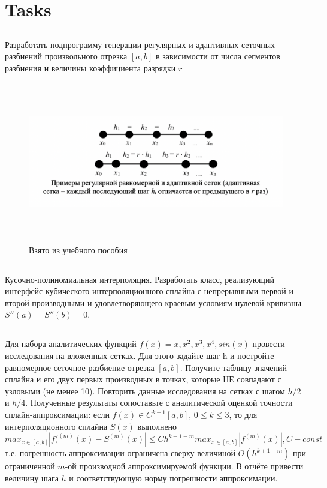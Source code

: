\section{Tasks}


\subsection{}
Разработать подпрограмму генерации регулярных и адаптивных сеточных разбиений произвольного отрезка \([a, b]\) в зависимости от числа сегментов разбиения и величины коэффициента разрядки \(r\)
\begin{figure}
	\includegraphics[width=\linewidth, height=7cm]{images/imaget1.png}
	\caption{Взято из учебного пособия}
\end{figure}

\subsection{}
Кусочно-полиномиальная интерполяция. Разработать класс, реализующий интерфейс кубического интерполяционного сплайна с непрерывными первой и второй производными и удовлетворяющего краевым условиям нулевой кривизны \(S'' (a) = S'' (b) = 0\).

\subsection{}
Для набора аналитических функций \(f(x) = x, x^2, x^3, x^4, sin(x)\) провести исследования на вложенных сетках. Для этого задайте шаг h и постройте равномерное сеточное разбиение отрезка \([a, b]\). Получите таблицу значений сплайна и его двух первых производных в точках, которые НЕ совпадают с узловыми (не менее 10). Повторить данные исследования на сетках с шагом \(h/2\) и \(h/4\). Полученные результаты сопоставьте с аналитической оценкой точности сплайн-аппроксимации: если \(f(x)\in C^{k + 1}[a, b]\), \(0 \leq k \leq 3\), то для интерполяционного сплайна \(S(x)\) выполнено \(max _{x\in [a,b] }|f(^{(m)}(x) − S^{(m)}(x)| \leq Ch^{k+1-m} max_{x\in [a,b] }|f^{(m)}(x)|, C - const\) т.е. погрешность аппроксимации ограничена сверху величиной \(O(h^{k+1-m})\) при ограниченной \(m\)-ой производной аппроксимируемой функции. В отчёте привести величину шага \(h\) и соответствующую норму погрешности аппроксимации.


